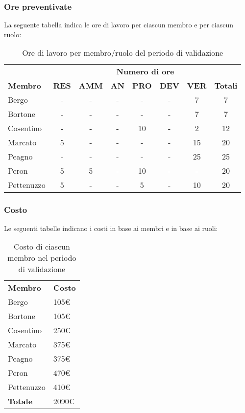 	\subsubsection{Ore preventivate}
		La seguente tabella indica le ore di lavoro per ciascun membro e per ciascun ruolo:
		\begin{table}[h]
		\centering
		\begin{tabular}{| l | c c c c c c | c |}
			\rowcolor{LightBlue}
			& \multicolumn{7}{c}{\textbf{\color{white}Numero di ore}}	\\
	
			\rowcolor{LightBlue}
			\textbf{\color{white}Membro}
			& \textbf{\color{white}RES}
			& \textbf{\color{white}AMM}
			& \textbf{\color{white}AN}
			& \textbf{\color{white}PRO}
			& \textbf{\color{white}DEV}
			& \textbf{\color{white}VER}
			& \textbf{\color{white}Totali}\\

			Bergo      & - & - & - & - & - & 7 & 7  \\
			Bortone    & - & - & - & - & - & 7 & 7  \\
			Cosentino  & - & - & - & 10 & - & 2 & 12\\
			Marcato    & 5 & - & - & - & - & 15 & 20\\
			Peagno     & - & - & - & - & - & 25 & 25\\
			Peron      & 5 & 5 & - & 10 & - & - & 20\\
			Pettenuzzo & 5 & - & - & 5 & - & 10 & 20\\ \hline
		\end{tabular}
		\caption{Ore di lavoro per membro/ruolo del periodo di validazione}
		\end{table}
		
	\subsubsection{Costo}
		Le seguenti tabelle indicano i costi in base ai membri e in base ai ruoli:
		\begin{table}[h]
		\centering
		\begin{tabular}{| l | l |}
			\rowcolor{LightBlue}
			\textbf{\color{white}Membro}
			& \textbf{\color{white}Costo}\\
			
			Bergo				& 105€\\
			Bortone			& 105€\\
			Cosentino		& 250€\\
			Marcato			& 375€\\
			Peagno				& 375€\\
			Peron				& 470€\\
			Pettenuzzo		& 410€\\ \hline
			\textbf{Totale} & 2090€\\ \hline
		\end{tabular}
		\caption{Costo di ciascun membro nel periodo di validazione}
		\end{table}
		
